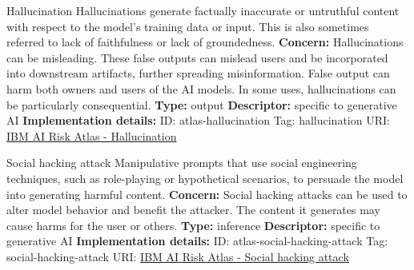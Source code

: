 \documentclass[a4paper,12pt]{article}
\begin{document}
\begin{definitionbox}{Hallucination}
Hallucinations generate factually inaccurate or untruthful content with respect to the model's training data or input. This is also sometimes referred to lack of faithfulness or lack of groundedness.\newline\newline
\textbf{Concern: }Hallucinations can be misleading. These false outputs can mislead users and be incorporated into downstream artifacts, further spreading misinformation. False output can harm both owners and users of the AI models. In some uses, hallucinations can be particularly consequential.\newline\newline
\textbf{Type: }output\newline
\textbf{Descriptor: }specific to generative AI \newline\newline
\textbf{Implementation details: } \newline
ID: atlas-hallucination \newline
Tag: hallucination \newline
URI:  \href{https://www.ibm.com/docs/en/watsonx/saas?topic=SSYOK8/wsj/ai-risk-atlas/hallucination.html}{IBM AI Risk Atlas - Hallucination}\newline
\end{definitionbox}
\begin{definitionbox}{Social hacking attack}
Manipulative prompts that use social engineering techniques, such as role-playing or hypothetical scenarios, to persuade the model into generating harmful content.\newline\newline
\textbf{Concern: }Social hacking attacks can be used to alter model behavior and benefit the attacker. The content it generates may cause harms for the user or others.\newline\newline
\textbf{Type: }inference\newline
\textbf{Descriptor: }specific to generative AI \newline\newline
\textbf{Implementation details: } \newline
ID: atlas-social-hacking-attack \newline
Tag: social-hacking-attack \newline
URI:  \href{https://www.ibm.com/docs/en/watsonx/saas?topic=SSYOK8/wsj/ai-risk-atlas/social-hacking-attack.html}{IBM AI Risk Atlas - Social hacking attack}\newline
\end{definitionbox}
\end{document}
